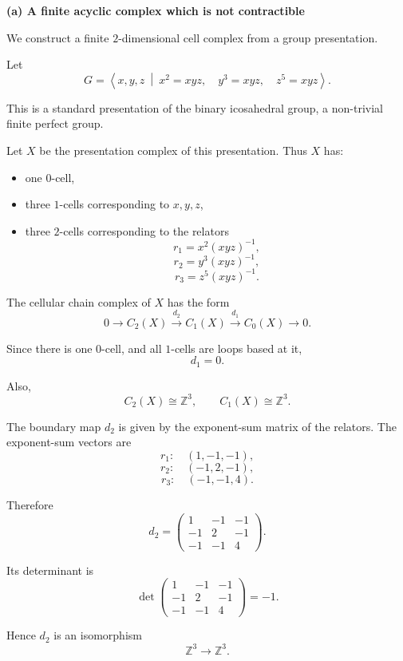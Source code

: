 \begin{solution}

\medskip
\noindent\textbf{(a) A finite acyclic complex which is not contractible}\par
\smallskip


We construct a finite \(2\)-dimensional cell complex from a group presentation.

Let
\[
G=
\left\langle
x,y,z
\ \middle|\
x^2=xyz,\quad
y^3=xyz,\quad
z^5=xyz
\right\rangle.
\]

This is a standard presentation of the binary icosahedral group, a non-trivial finite perfect group.

Let \(X\) be the presentation complex of this presentation. Thus \(X\) has:

\begin{itemize}
	\item one \(0\)-cell,
	\item three \(1\)-cells corresponding to \(x,y,z\),
	\item three \(2\)-cells corresponding to the relators
	\[
	r_1=x^2(xyz)^{-1},
	\]
	\[
	r_2=y^3(xyz)^{-1},
	\]
	\[
	r_3=z^5(xyz)^{-1}.
	\]
\end{itemize}

The cellular chain complex of \(X\) has the form
\[
0
\longrightarrow
C_2(X)
\xrightarrow{d_2}
C_1(X)
\xrightarrow{d_1}
C_0(X)
\longrightarrow
0.
\]

Since there is one \(0\)-cell, and all \(1\)-cells are loops based at it,
\[
d_1=0.
\]

Also,
\[
C_2(X)\cong \mathbb Z^3,
\qquad
C_1(X)\cong \mathbb Z^3.
\]

The boundary map \(d_2\) is given by the exponent-sum matrix of the relators. The exponent-sum vectors are
\[
r_1:\quad (1,-1,-1),
\]
\[
r_2:\quad (-1,2,-1),
\]
\[
r_3:\quad (-1,-1,4).
\]

Therefore
\[
d_2
=
\begin{pmatrix}
	1 & -1 & -1\\
	-1 & 2 & -1\\
	-1 & -1 & 4
\end{pmatrix}.
\]

Its determinant is
\[
\det
\begin{pmatrix}
	1 & -1 & -1\\
	-1 & 2 & -1\\
	-1 & -1 & 4
\end{pmatrix}
=
-1.
\]

Hence \(d_2\) is an isomorphism
\[
\mathbb Z^3\to \mathbb Z^3.
\]


\end{solution}
